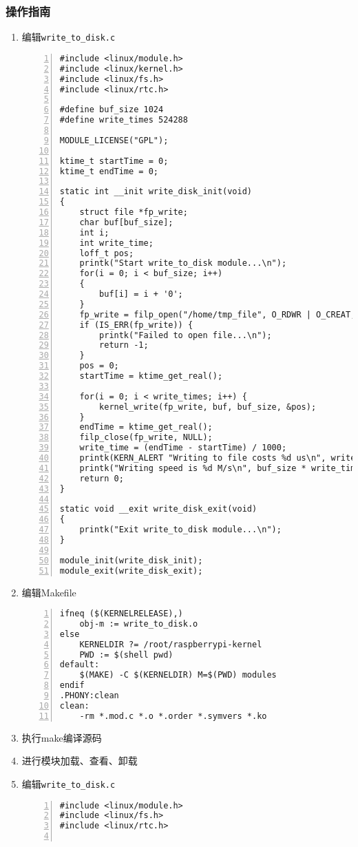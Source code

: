 \documentclass{article}
\begin{document}
\subsubsection{操作指南}
\begin{enumerate}
	\item 编辑\verb|write_to_disk.c|
	      \begin{lstlisting}[numbers=left]
#include <linux/module.h>
#include <linux/kernel.h> 
#include <linux/fs.h>
#include <linux/rtc.h>

#define buf_size 1024
#define write_times 524288

MODULE_LICENSE("GPL");

ktime_t startTime = 0;
ktime_t endTime = 0;

static int __init write_disk_init(void)
{
	struct file *fp_write;
	char buf[buf_size];
	int i;
	int write_time;
	loff_t pos;
	printk("Start write_to_disk module...\n");
	for(i = 0; i < buf_size; i++)
	{
		buf[i] = i + '0';
	}
	fp_write = filp_open("/home/tmp_file", O_RDWR | O_CREAT,0644);
	if (IS_ERR(fp_write)) {
		printk("Failed to open file...\n");
		return -1;
	}
	pos = 0;
    startTime = ktime_get_real();

	for(i = 0; i < write_times; i++) {
		kernel_write(fp_write, buf, buf_size, &pos);
	}
	endTime = ktime_get_real();
	filp_close(fp_write, NULL);
	write_time = (endTime - startTime) / 1000;
	printk(KERN_ALERT "Writing to file costs %d us\n", write_time);	
	printk("Writing speed is %d M/s\n", buf_size * write_times / write_time);
	return 0;
}

static void __exit write_disk_exit(void)
{
	printk("Exit write_to_disk module...\n");
}

module_init(write_disk_init);
module_exit(write_disk_exit);

\end{lstlisting}
	\item 编辑Makefile
	      \begin{lstlisting}[numbers=left]
ifneq ($(KERNELRELEASE),)
	obj-m := write_to_disk.o
else
	KERNELDIR ?= /root/raspberrypi-kernel
	PWD := $(shell pwd)
default:
	$(MAKE) -C $(KERNELDIR) M=$(PWD) modules
endif
.PHONY:clean
clean:
	-rm *.mod.c *.o *.order *.symvers *.ko

\end{lstlisting}
	\item 执行make编译源码
	\item 进行模块加载、查看、卸载
	\item 编辑\verb|write_to_disk.c|
	      \begin{lstlisting}[numbers=left]
#include <linux/module.h>
#include <linux/fs.h>
#include <linux/rtc.h>


\end{lstlisting}
\end{enumerate}
\end{document}
